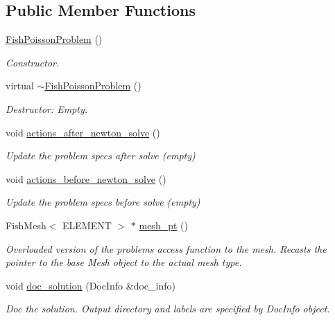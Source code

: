 \subsection*{Public Member Functions}
\begin{DoxyCompactItemize}
\item 
\hyperlink{classFishPoissonProblem_ab283ed2dc6985c2871afb09d96b0cff0}{Fish\+Poisson\+Problem} ()
\begin{DoxyCompactList}\small\item\em Constructor. \end{DoxyCompactList}\item 
virtual \hyperlink{classFishPoissonProblem_ad4e0b221af80c3bcc77badc40657a385}{$\sim$\+Fish\+Poisson\+Problem} ()
\begin{DoxyCompactList}\small\item\em Destructor\+: Empty. \end{DoxyCompactList}\item 
void \hyperlink{classFishPoissonProblem_a76f4ada436ceaa1d0ba96289503d99aa}{actions\+\_\+after\+\_\+newton\+\_\+solve} ()
\begin{DoxyCompactList}\small\item\em Update the problem specs after solve (empty) \end{DoxyCompactList}\item 
void \hyperlink{classFishPoissonProblem_a4f3ddd6ae8117d36cace040a2cad68a3}{actions\+\_\+before\+\_\+newton\+\_\+solve} ()
\begin{DoxyCompactList}\small\item\em Update the problem specs before solve (empty) \end{DoxyCompactList}\item 
Fish\+Mesh$<$ E\+L\+E\+M\+E\+NT $>$ $\ast$ \hyperlink{classFishPoissonProblem_a084fca53b2a82803d07326ba27af75ec}{mesh\+\_\+pt} ()
\begin{DoxyCompactList}\small\item\em Overloaded version of the problem\textquotesingle{}s access function to the mesh. Recasts the pointer to the base Mesh object to the actual mesh type. \end{DoxyCompactList}\item 
void \hyperlink{classFishPoissonProblem_a728ae67316d80029132b98b6a4e5ffe5}{doc\+\_\+solution} (Doc\+Info \&doc\+\_\+info)
\begin{DoxyCompactList}\small\item\em Doc the solution. Output directory and labels are specified by Doc\+Info object. \end{DoxyCompactList}\end{DoxyCompactItemize}


